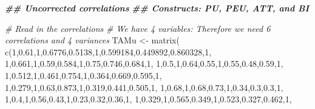 \documentclass[
]{book}
\newenvironment{Shaded}{\begin{snugshade}}{\end{snugshade}}
\newcommand{\CommentTok}[1]{\textcolor[rgb]{0.56,0.35,0.01}{\textit{#1}}}
\newcommand{\DecValTok}[1]{\textcolor[rgb]{0.00,0.00,0.81}{#1}}
\newcommand{\DocumentationTok}[1]{\textcolor[rgb]{0.56,0.35,0.01}{\textbf{\textit{#1}}}}
\newcommand{\FloatTok}[1]{\textcolor[rgb]{0.00,0.00,0.81}{#1}}
\newcommand{\FunctionTok}[1]{\textcolor[rgb]{0.00,0.00,0.00}{#1}}
\newcommand{\NormalTok}[1]{#1}
\newcommand{\OtherTok}[1]{\textcolor[rgb]{0.56,0.35,0.01}{#1}}
\begin{document}
\begin{Shaded}
\begin{Highlighting}[]
\DocumentationTok{\#\# Uncorrected correlations}
\DocumentationTok{\#\# Constructs: PU, PEU, ATT, and BI}

\CommentTok{\# Read in the correlations}
\CommentTok{\# We have 4 variables: Therefore we need 6 correlations and 4 variances}
\NormalTok{TAMu }\OtherTok{\textless{}{-}} \FunctionTok{matrix}\NormalTok{(}
    \FunctionTok{c}\NormalTok{(}\DecValTok{1}\NormalTok{,}\FloatTok{0.61}\NormalTok{,}\DecValTok{1}\NormalTok{,}\FloatTok{0.6776}\NormalTok{,}\FloatTok{0.5138}\NormalTok{,}\DecValTok{1}\NormalTok{,}\FloatTok{0.599184}\NormalTok{,}\FloatTok{0.449892}\NormalTok{,}\FloatTok{0.860328}\NormalTok{,}\DecValTok{1}\NormalTok{,}
        \DecValTok{1}\NormalTok{,}\FloatTok{0.661}\NormalTok{,}\DecValTok{1}\NormalTok{,}\FloatTok{0.59}\NormalTok{,}\FloatTok{0.584}\NormalTok{,}\DecValTok{1}\NormalTok{,}\FloatTok{0.75}\NormalTok{,}\FloatTok{0.746}\NormalTok{,}\FloatTok{0.684}\NormalTok{,}\DecValTok{1}\NormalTok{,}
        \DecValTok{1}\NormalTok{,}\FloatTok{0.5}\NormalTok{,}\DecValTok{1}\NormalTok{,}\FloatTok{0.64}\NormalTok{,}\FloatTok{0.55}\NormalTok{,}\DecValTok{1}\NormalTok{,}\FloatTok{0.55}\NormalTok{,}\FloatTok{0.48}\NormalTok{,}\FloatTok{0.59}\NormalTok{,}\DecValTok{1}\NormalTok{,}
        \DecValTok{1}\NormalTok{,}\FloatTok{0.512}\NormalTok{,}\DecValTok{1}\NormalTok{,}\FloatTok{0.461}\NormalTok{,}\FloatTok{0.754}\NormalTok{,}\DecValTok{1}\NormalTok{,}\FloatTok{0.364}\NormalTok{,}\FloatTok{0.669}\NormalTok{,}\FloatTok{0.595}\NormalTok{,}\DecValTok{1}\NormalTok{,}
        \DecValTok{1}\NormalTok{,}\FloatTok{0.279}\NormalTok{,}\DecValTok{1}\NormalTok{,}\FloatTok{0.63}\NormalTok{,}\FloatTok{0.873}\NormalTok{,}\DecValTok{1}\NormalTok{,}\FloatTok{0.319}\NormalTok{,}\FloatTok{0.441}\NormalTok{,}\FloatTok{0.505}\NormalTok{,}\DecValTok{1}\NormalTok{,}
        \DecValTok{1}\NormalTok{,}\FloatTok{0.68}\NormalTok{,}\DecValTok{1}\NormalTok{,}\FloatTok{0.68}\NormalTok{,}\FloatTok{0.73}\NormalTok{,}\DecValTok{1}\NormalTok{,}\FloatTok{0.34}\NormalTok{,}\FloatTok{0.3}\NormalTok{,}\FloatTok{0.3}\NormalTok{,}\DecValTok{1}\NormalTok{,}
        \DecValTok{1}\NormalTok{,}\FloatTok{0.4}\NormalTok{,}\DecValTok{1}\NormalTok{,}\FloatTok{0.56}\NormalTok{,}\FloatTok{0.43}\NormalTok{,}\DecValTok{1}\NormalTok{,}\FloatTok{0.23}\NormalTok{,}\FloatTok{0.32}\NormalTok{,}\FloatTok{0.36}\NormalTok{,}\DecValTok{1}\NormalTok{,}
        \DecValTok{1}\NormalTok{,}\FloatTok{0.329}\NormalTok{,}\DecValTok{1}\NormalTok{,}\FloatTok{0.565}\NormalTok{,}\FloatTok{0.349}\NormalTok{,}\DecValTok{1}\NormalTok{,}\FloatTok{0.523}\NormalTok{,}\FloatTok{0.327}\NormalTok{,}\FloatTok{0.462}\NormalTok{,}\DecValTok{1}\NormalTok{,}

\end{Highlighting}
\end{Shaded}
\end{document}

